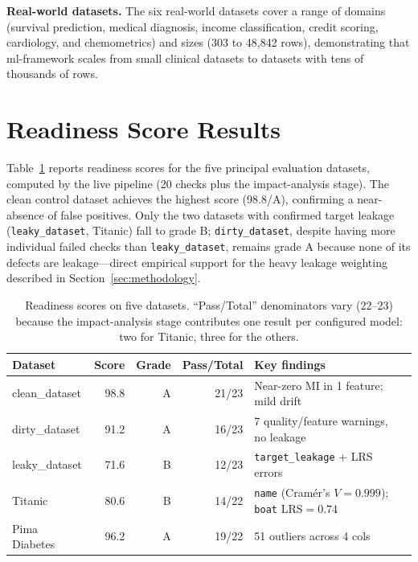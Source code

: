 \documentclass[12pt,a4paper]{report}
\newcommand{\tblhead}{\rowcolor{tblHeadBg}\color{white}\bfseries}
\begin{document}
\textbf{Real-world datasets.} The six real-world datasets cover a range of domains
(survival prediction, medical diagnosis, income classification, credit scoring, cardiology,
and chemometrics) and sizes (303 to 48,842 rows), demonstrating that ml-framework scales
from small clinical datasets to datasets with tens of thousands of rows.

\section{Readiness Score Results}
\label{sec:readiness}

Table~\ref{tab:readiness} reports readiness scores for the five principal evaluation
datasets, computed by the live pipeline (20 checks plus the impact-analysis stage).  The
clean control dataset achieves the highest score (98.8/A), confirming a near-absence of
false positives.  Only the two datasets with confirmed target leakage
(\texttt{leaky\_dataset}, Titanic) fall to grade B; \texttt{dirty\_dataset}, despite having
more individual failed checks than \texttt{leaky\_dataset}, remains grade A because none of
its defects are leakage---direct empirical support for the heavy leakage weighting
described in Section~\ref{sec:methodology}.

\begin{table}[!ht]
\centering
\caption{Readiness scores on five datasets. ``Pass/Total'' denominators vary (22--23)
  because the impact-analysis stage contributes one result per configured model: two for
  Titanic, three for the others.}
\label{tab:readiness}
\begin{tabularx}{\textwidth}{lrrrlX}
\toprule
\tblhead \textbf{Dataset} & \textbf{Score} & \textbf{Grade} & \textbf{Pass/Total} & \textbf{Key findings} \\
\midrule
clean\_dataset & 98.8 & A & 21/23 & Near-zero MI in 1 feature; mild drift \\
dirty\_dataset & 91.2 & A & 16/23 & 7 quality/feature warnings, no leakage \\
leaky\_dataset & 71.6 & B & 12/23 & \texttt{target\_leakage} + LRS errors \\
Titanic        & 80.6 & B & 14/22 & \texttt{name} (Cram\'er's $V{=}0.999$); \texttt{boat} LRS$=0.74$ \\
Pima Diabetes  & 96.2 & A & 19/22 & 51 outliers across 4 cols \\
\bottomrule
\end{tabularx}
\end{table}
\end{document}
